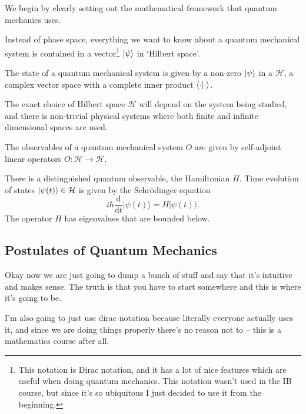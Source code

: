 \documentclass[a4paper]{article}
\begin{document}
We begin by clearly setting out the mathematical framework that quantum mechanics uses.

Instead of phase space, everything we want to know about a quantum mechanical system is contained in a vector\footnote{This notation is Dirac notation, and it has a lot of nice features which are useful when doing quantum mechanics. This notation wasn't used in the IB course, but since it's so ubiquitous I just decided to use it from the beginning.} $\ket{\psi}$ in `Hilbert space'.

\begin{axiom}[State]
    The state of a quantum mechanical system is given by a non-zero  $\ket{\psi}$ in a  $\mathcal{H}$, a complex vector space with a complete inner product $\ip{\cdot}{\cdot}$.
\end{axiom}

The exact choice of Hilbert space $\mathcal{H}$ will depend on the system being studied, and there is non-trivial physical systems where both finite and infinite dimensional spaces are used.

\begin{axiom}[Observables]
    The observables of a quantum mechanical system $O$ are given by self-adjoint linear operators $O: \mathcal{H} \rightarrow \mathcal{H}$.
\end{axiom}

\begin{axiom}
    There is a distinguished quantum observable, the Hamiltonian $H$. Time evolution of states $\ket{\psi(t)} \in \mathcal{H}$ is given by the Schrödinger equation
    $$
    i \hbar \frac{\mathrm{d}}{\mathrm{d} t}|\psi(t)\rangle=H|\psi(t)\rangle.
    $$
    The operator $H$ has eigenvalues that are bounded below.
\end{axiom}

\subsection{Postulates of Quantum Mechanics}

Okay now we are just going to dump a bunch of stuff and say that it's intuitive and makes sense. The truth is that you have to start somewhere and this is where it's going to be.

I'm also going to just use dirac notation because literally everyone actually uses it, and since we are doing things properly there's no reason not to -- this is a mathematics course after all.
\end{document}
